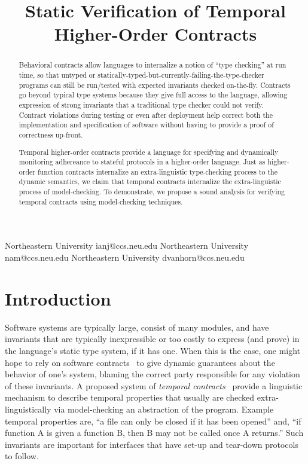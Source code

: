 \documentclass[preprint,onecolumn,9pt]{sigplanconf} %
\begin{document}
\copyrightdata{[to be supplied]}
\title{Static Verification of Temporal Higher-Order Contracts}

           {Northeastern University}
           {ianj@ccs.neu.edu}
           {Northeastern University}
           {nam@ccs.neu.edu}
           {Northeastern University}
           {dvanhorn@ccs.neu.edu}
\maketitle
\begin{abstract}
  Behavioral contracts allow languages to internalize a notion of ``type checking'' at run time, so that untyped or statically-typed-but-currently-failing-the-type-checker programs can still be run/tested with expected invariants checked on-the-fly.
%
  Contracts go beyond typical type systems because they give full access to the language, allowing expression of strong invariants that a traditional type checker could not verify.
%
  Contract violations during testing or even after deployment help correct both the implementation and specification of software without having to provide a proof of correctness up-front.

  Temporal higher-order contracts provide a language for specifying and dynamically monitoring adhereance to stateful protocols in a higher-order language.
%
  Just as higher-order function contracts internalize an extra-linguistic type-checking process to the dynamic semantics, we claim that temporal contracts internalize the extra-linguistic process of model-checking.
%
  To demonstrate, we propose a sound analysis for verifying temporal contracts using model-checking techniques.
\end{abstract}

\section{Introduction}

Software systems are typically large, consist of many modules, and have invariants that are typically inexpressible or too costly to express (and prove) in the language's static type system, if it has one.
%
When this is the case, one might hope to rely on software contracts~\cite{dvanhorn:Findler2002Contracts} to give dynamic guarantees about the behavior of one's system, blaming the correct party responsible for any violation of these invariants.
%
A proposed system of \emph{temporal contracts}~\citep{ianjohnson:dfm:icfp2011} provide a linguistic mechanism to describe temporal properties that usually are checked extra-linguistically via model-checking an abstraction of the program.
%
Example temporal properties are, ``a file can only be closed if it has been opened'' and, ``if function A is given a function B, then B may not be called once A returns.''
%
Such invariants are important for interfaces that have set-up and tear-down protocols to follow.
\end{document}
